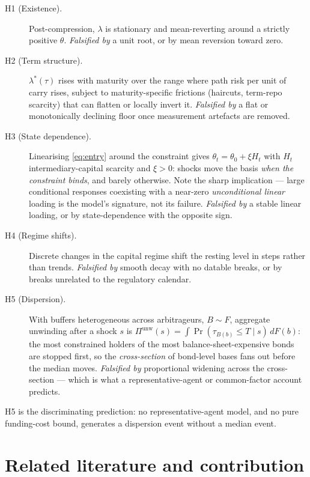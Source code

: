 \documentclass[11pt]{article}
\begin{document}
\begin{description}
\item[H1 (Existence).] Post-compression, $\lambda$ is stationary and mean-reverting around a strictly positive $\theta$. \emph{Falsified by} a unit root, or by mean reversion toward zero.
\item[H2 (Term structure).] $\lambda^\ast(\tau)$ rises with maturity over the range where path risk per unit of carry rises, subject to maturity-specific frictions (haircuts, term-repo scarcity) that can flatten or locally invert it. \emph{Falsified by} a flat or monotonically declining floor once measurement artefacts are removed.
\item[H3 (State dependence).] Linearising \eqref{eq:entry} around the constraint gives $\theta_t=\theta_0+\xi H_t$ with $H_t$ intermediary-capital scarcity and $\xi>0$: shocks move the basis \emph{when the constraint binds}, and barely otherwise. Note the sharp implication --- large conditional responses coexisting with a near-zero \emph{unconditional linear} loading is the model's signature, not its failure. \emph{Falsified by} a stable linear loading, or by state-dependence with the opposite sign.
\item[H4 (Regime shifts).] Discrete changes in the capital regime shift the resting level in steps rather than trends. \emph{Falsified by} smooth decay with no datable breaks, or by breaks unrelated to the regulatory calendar.
\item[H5 (Dispersion).] With buffers heterogeneous across arbitrageurs, $B\sim F$, aggregate unwinding after a shock $s$ is $\Pi^{\text{unw}}(s)=\int\Pr(\tau_{B(b)}\le T\mid s)\,dF(b)$: the most constrained holders of the most balance-sheet-expensive bonds are stopped first, so the \emph{cross-section} of bond-level bases fans out before the median moves. \emph{Falsified by} proportional widening across the cross-section --- which is what a representative-agent or common-factor account predicts.
\end{description}

H5 is the discriminating prediction: no representative-agent model, and no pure funding-cost bound, generates a dispersion event without a median event.

\section{Related literature and contribution}\label{sec:lit}
\end{document}
